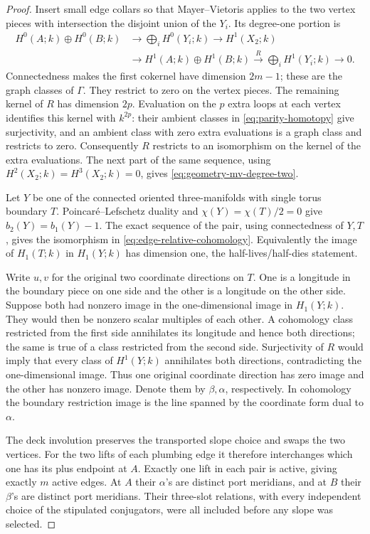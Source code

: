 \begin{proof}
Insert small edge collars so that Mayer--Vietoris applies to the two
vertex pieces with intersection the disjoint union of the \(Y_i\).
Its degree-one portion is
\[
\begin{aligned}
 H^0(A;k)\oplus H^0(B;k)
 &\longrightarrow\bigoplus_iH^0(Y_i;k)
 \longrightarrow H^1(X_2;k)\\
 &\longrightarrow H^1(A;k)\oplus H^1(B;k)
 \xrightarrow{\,R\,}\bigoplus_iH^1(Y_i;k)
 \longrightarrow0 .
\end{aligned}
\]
Connectedness makes the first cokernel have dimension \(2m-1\);
these are the graph classes of \(\Gamma\).
They restrict to zero on the vertex pieces. The remaining kernel of
\(R\) has dimension \(2p\). Evaluation on the \(p\) extra loops at each
vertex identifies this kernel with \(k^{2p}\): their ambient classes in
\eqref{eq:parity-homotopy} give surjectivity, and an ambient class with
zero extra evaluations is a graph class and restricts to zero.
Consequently \(R\) restricts to an isomorphism on the kernel of the
extra evaluations. The next part of the same sequence, using
\(H^2(X_2;k)=H^3(X_2;k)=0\), gives
\eqref{eq:geometry-mv-degree-two}.

Let \(Y\) be one of the connected oriented three-manifolds with single
torus boundary \(T\). Poincaré--Lefschetz duality and
\(\chi(Y)=\chi(T)/2=0\) give \(b_2(Y)=b_1(Y)-1\).
The exact sequence of the pair, using connectedness of \(Y,T\), gives
the isomorphism in \eqref{eq:edge-relative-cohomology}.
Equivalently the image of \(H_1(T;k)\) in \(H_1(Y;k)\) has dimension
one, the half-lives/half-dies statement.

Write \(u,v\) for the original two coordinate directions on \(T\).
One is a longitude in the boundary piece on one side and the other
is a longitude on the other side. Suppose both had nonzero image in
the one-dimensional image in \(H_1(Y;k)\). They would then be nonzero
scalar multiples of each other. A cohomology class restricted from
the first side annihilates its longitude and hence both directions;
the same is true of a class restricted from the second side.
Surjectivity of \(R\) would imply that every class of \(H^1(Y;k)\)
annihilates both directions, contradicting the one-dimensional image.
Thus one original coordinate direction has zero image and the other
has nonzero image. Denote them by \(\beta,\alpha\), respectively.
In cohomology the boundary restriction image is the line spanned by
the coordinate form dual to \(\alpha\).

The deck involution preserves the transported slope choice and swaps the
two vertices. For the two lifts of each plumbing edge it therefore
interchanges which one has its plus endpoint at \(A\).
Exactly one lift in each pair is active, giving exactly \(m\) active
edges. At \(A\) their \(\alpha\)'s are distinct port meridians, and at
\(B\) their \(\beta\)'s are distinct port meridians. Their three-slot
relations, with every independent choice of the stipulated conjugators,
were all included before any slope was selected.
\end{proof}

